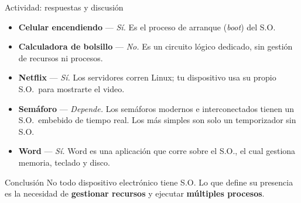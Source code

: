 \documentclass[xcolor=svgnames]{beamer}
\begin{document}
\begin{frame}{Actividad: respuestas y discusión}

  \begin{itemize}
    \item[\textcolor{mqred}{\ding{51}}] \textbf{Celular encendiendo} — \textit{Sí.} Es el proceso de arranque (\textit{boot}) del S.O.
    \item[\textcolor{mqred}{\ding{55}}] \textbf{Calculadora de bolsillo} — \textit{No.} Es un circuito lógico dedicado, sin gestión de recursos ni procesos.
    \item[\textcolor{mqred}{\ding{51}}] \textbf{Netflix} — \textit{Sí.} Los servidores corren Linux; tu dispositivo usa su propio S.O.\ para mostrarte el video.
    \item[\textcolor{mqred}{\ding{228}}] \textbf{Semáforo} — \textit{Depende.} Los semáforos modernos e interconectados tienen un S.O.\ embebido de tiempo real. Los más simples son solo un temporizador sin S.O.
    \item[\textcolor{mqred}{\ding{51}}] \textbf{Word} — \textit{Sí.} Word es una aplicación que corre sobre el S.O., el cual gestiona memoria, teclado y disco.
  \end{itemize}

  \vspace{0.2cm}
  \begin{exampleblock}{Conclusión}
    No todo dispositivo electrónico tiene S.O. Lo que define su presencia es la necesidad de \textbf{gestionar recursos} y ejecutar \textbf{múltiples procesos}.
  \end{exampleblock}

\end{frame}
\end{document}
